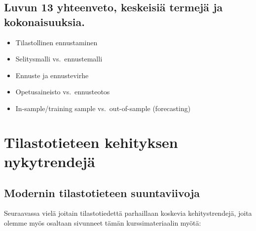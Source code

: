 \documentclass[
]{book}
\providecommand{\tightlist}{%
  \setlength{\itemsep}{0pt}\setlength{\parskip}{0pt}}
\begin{document}
\hypertarget{luvun-13-yhteenveto-keskeisiuxe4-termejuxe4-ja-kokonaisuuksia.}{%
\section{Luvun 13 yhteenveto, keskeisiä termejä ja kokonaisuuksia.}\label{luvun-13-yhteenveto-keskeisiuxe4-termejuxe4-ja-kokonaisuuksia.}}

\begin{itemize}
\tightlist
\item
  Tilastollinen ennustaminen
\item
  Selitysmalli vs.~ennustemalli
\item
  Ennuste ja ennustevirhe
\item
  Opetusaineisto vs.~ennusteotos
\item
  In-sample/training sample vs.~out-of-sample (forecasting)
\end{itemize}

\hypertarget{luku14}{%
\chapter{Tilastotieteen kehityksen nykytrendejä}\label{luku14}}

\hypertarget{modernin-tilastotieteen-suuntaviivoja}{%
\section{Modernin tilastotieteen suuntaviivoja}\label{modernin-tilastotieteen-suuntaviivoja}}

Seuraavassa vielä joitain tilastotiedettä parhaillaan koskevia kehitystrendejä, joita olemme myös osaltaan sivunneet tämän kurssimateriaalin myötä:
\end{document}
